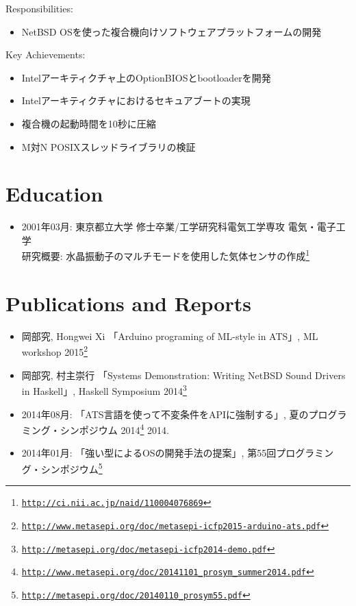 \documentclass[letterpaper]{article}
\begin{document}
\noindent Responsibilities:

\begin{itemize}
  \item NetBSD OSを使った複合機向けソフトウェアプラットフォームの開発
\end{itemize}

\noindent Key Achievements:

\begin{itemize}
  \item Intelアーキティクチャ上のOptionBIOSとbootloaderを開発
  \item Intelアーキティクチャにおけるセキュアブートの実現
  \item 複合機の起動時間を10秒に圧縮
  \item M対N POSIXスレッドライブラリの検証
\end{itemize}

\section*{Education}

\begin{itemize}
  \item 2001年03月: 東京都立大学 修士卒業/工学研究科電気工学専攻 電気・電子工学 \\
    研究概要: 水晶振動子のマルチモードを使用した気体センサの作成\footnote{\href{http://ci.nii.ac.jp/naid/110004076869}{\tt http://ci.nii.ac.jp/naid/110004076869}}
\end{itemize}

\section*{Publications and Reports}

\begin{itemize}
  \item 岡部究, Hongwei Xi 「Arduino programing of ML-style in ATS」, ML workshop 2015\footnote{\href{http://www.metasepi.org/doc/metasepi-icfp2015-arduino-ats.pdf}{\tt http://www.metasepi.org/doc/metasepi-icfp2015-arduino-ats.pdf}}
  \item 岡部究, 村主崇行 「Systems Demonstration: Writing NetBSD Sound Drivers in Haskell」, Haskell Symposium 2014\footnote{\href{http://metasepi.org/doc/metasepi-icfp2014-demo.pdf}{\tt http://metasepi.org/doc/metasepi-icfp2014-demo.pdf}}
  \item 2014年08月: 「ATS言語を使って不変条件をAPIに強制する」, 夏のプログラミング・シンポジウム 2014\footnote{\href{http://www.metasepi.org/doc/20141101\_prosym\_summer2014.pdf}{\tt http://www.metasepi.org/doc/20141101\_prosym\_summer2014.pdf}}  2014.
  \item 2014年01月: 「強い型によるOSの開発手法の提案」, 第55回プログラミング・シンポジウム\footnote{\href{http://metasepi.org/doc/20140110\_prosym55.pdf}{\tt http://metasepi.org/doc/20140110\_prosym55.pdf}}
\end{itemize}
\end{document}
